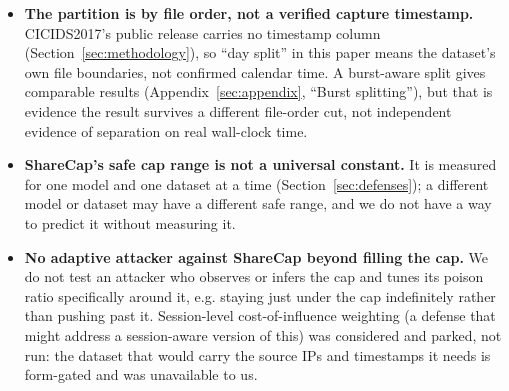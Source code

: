 \begin{itemize}
  \item \textbf{The partition is by file order, not a verified capture timestamp.}
    CICIDS2017's public  release carries no timestamp column
    (Section~\ref{sec:methodology}), so “day split” in this paper means the dataset's own file
    boundaries, not confirmed calendar time. A burst-aware split gives comparable results
    (Appendix~\ref{sec:appendix}, “Burst splitting”), but that is evidence the result survives a
    different file-order cut, not independent evidence of separation on real wall-clock time.
  \item \textbf{ShareCap's safe cap range is not a universal constant.} It is measured for one
    model and one dataset at a time (Section~\ref{sec:defenses}); a different model or dataset
    may have a different safe range, and we do not have a way to predict it without measuring it.
  \item \textbf{No adaptive attacker against ShareCap beyond filling the cap.} We do not test an
    attacker who observes or infers the cap and tunes its poison ratio specifically around it,
    e.g. staying just under the cap indefinitely rather than pushing past it. Session-level
    cost-of-influence weighting (a defense that might address a session-aware version of this)
    was considered and parked, not run: the dataset that would carry the source IPs and
    timestamps it needs is form-gated and was unavailable to us.
\end{itemize}
